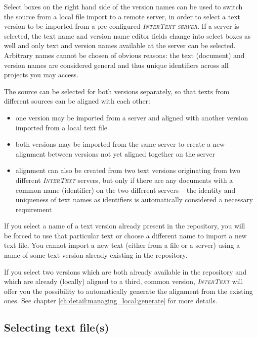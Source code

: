\documentclass[a4paper,10pt,oneside]{book}
\newcommand{\IT}{\textit{\textsc{InterText}}\xspace}
\newcommand{\ITserver}{\textit{\textsc{InterText server}}\xspace}
\begin{document}
Select boxes on the right hand side of the version names can be used to switch the source from a local file import to a remote server, in order to select a text version to be imported from a pre-configured \ITserver. If a server is selected, the text name and version name editor fields change into select boxes as well and only text and version names available at the server can be selected. Arbitrary names cannot be chosen of obvious reasons: the text (document) and version names are considered general and thus unique identifiers across all projects you may access.

The source can be selected for both versions separately, so that texts from different sources can be aligned with each other:

\begin{itemize}
 \item one version may be imported from a server and aligned with another version imported from a local text file
 \item both versions may be imported from the same server to create a new alignment between versions not yet aligned together on the server
 \item alignment can also be created from two text versions originating from two different \IT servers, but only if there are any documents with a common name (identifier) on the two different servers -- the identity and uniqueness of text names as identifiers is automatically considered a necessary requirement
\end{itemize}

If you select a name of a text version already present in the repository, you will be forced to use that particular text or choose a different name to import a new text file. You cannot import a new text (either from a file or a server) using a name of some text version already existing in the repository.

If you select two versions which are both already available in the repository and which are already (locally) aligned to a third, common version, \IT will offer you the possibility to automatically generate the alignment from the existing ones. See chapter \ref{ch:detail:managing_local:generate} for more details.

\subsection{Selecting text file(s)}\label{ch:detail:managing_local:new:files}
\end{document}
